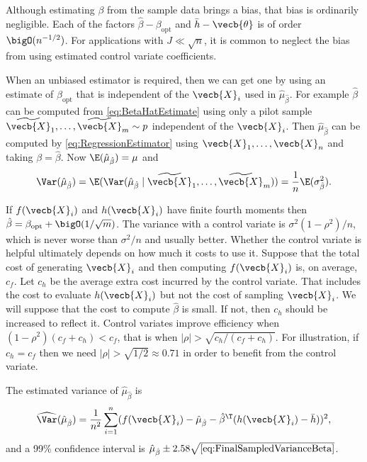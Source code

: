 Although estimating \(\beta\) from the sample data brings a bias, that bias is ordinarily negligible. Each of the factors \(\hat{\beta} - \beta_{\text{opt}}\) and \(\bar{h} - \vecb{\theta}\) is of order \(\bigO(n^{-1/2})\). For applications with \(J \ll \sqrt{n}\), it is common to neglect the bias from using estimated control variate coefficients.

When an unbiased estimator is required, then we can get one by using an estimate of \(\beta_{\text{opt}}\) that is independent of the \(\vecb{X}_i\) used in \(\hat{\mu}_{\hat{\beta}}\). For example \(\hat{\beta}\) can be computed from \cref{eq:BetaHatEstimate} using only a pilot sample \(\widetilde{\vecb{X}}_1, \dots, \widetilde{\vecb{X}}_m \sim p\) independent of the \(\vecb{X}_i\). Then \(\hat{\mu}_{\hat{\beta}}\) can be computed by \cref{eq:RegressionEstimator} using \(\vecb{X}_1, \dots, \vecb{X}_n\) and taking \(\beta = \hat{\beta}\). Now \(\E(\hat{\mu}_{\hat{\beta}}) = \mu\) and
\begin{equation}
	\Var(\hat{\mu}_{\hat{\beta}}) = \E(\Var(\hat{\mu}_{\hat{\beta}} \mid \widetilde{\vecb{X}}_1, \dots, \widetilde{\vecb{X}}_m)) = \frac{1}{n} \E(\sigma^2_{\hat{\beta}}).
	\label{eq:VarianceTotalBeta}
\end{equation}

If \(f(\vecb{X}_i)\) and \(h(\vecb{X}_i)\) have finite fourth moments then \(\hat{\beta} = \beta_{\text{opt}} + \bigO(1/\sqrt{m})\). The variance with a control variate is \(\sigma^2(1-\rho^2)/n\), which is never worse than \(\sigma^2/n\) and usually better. Whether the control variate is helpful ultimately depends on how much it costs to use it. Suppose that the total cost of generating \(\vecb{X}_i\) and then computing \(f(\vecb{X}_i)\) is, on average, \(c_f\). Let \(c_h\) be the average extra cost incurred by the control variate. That includes the cost to evaluate \(h(\vecb{X}_i)\) but not the cost of sampling \(\vecb{X}_i\). We will suppose that the cost to compute \(\hat{\beta}\) is small. If not, then \(c_h\) should be increased to reflect it. Control variates improve efficiency when \((1-\rho^2)(c_f + c_h) < c_f\), that is when \(|\rho| > \sqrt{c_h / (c_f + c_h)}\). For illustration, if \(c_h = c_f\) then we need \(|\rho| > \sqrt{1/2} \approx 0.71\) in order to benefit from the control variate.

The estimated variance of \(\hat{\mu}_{\hat{\beta}}\) is
\begin{equation}
	\widehat{\Var}(\hat{\mu}_{\hat{\beta}}) = \frac{1}{n^2} \sum_{i=1}^n (f(\vecb{X}_i) - \hat{\mu}_{\hat{\beta}} - \hat{\beta}^{\T} (h(\vecb{X}_i) - \bar{h}))^2,
	\label{eq:FinalSampledVarianceBeta}
\end{equation}
and a 99\% confidence interval is \(\hat{\mu}_{\hat{\beta}} \pm 2.58 \sqrt{\cref{eq:FinalSampledVarianceBeta}}\).

